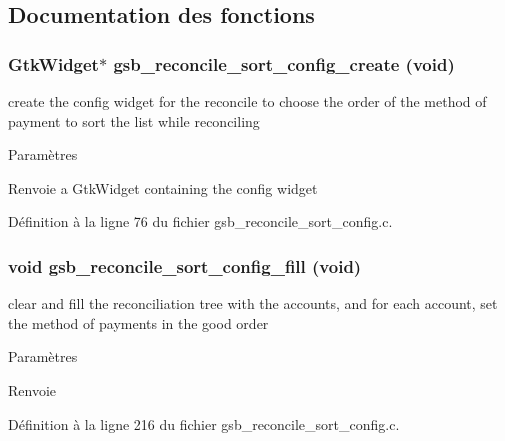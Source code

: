 \subsection{Documentation des fonctions}
\subsubsection[{gsb\_\-reconcile\_\-sort\_\-config\_\-create}]{\setlength{\rightskip}{0pt plus 5cm}GtkWidget$\ast$ gsb\_\-reconcile\_\-sort\_\-config\_\-create (void)}\label{gsb__reconcile__sort__config_8h_a9b08fc70938b33509231ca9cc5b8745f}
create the config widget for the reconcile to choose the order of the method of payment to sort the list while reconciling


\begin{DoxyParams}{Paramètres}
\item[{\em }]\end{DoxyParams}
\begin{DoxyReturn}{Renvoie}
a GtkWidget containing the config widget 
\end{DoxyReturn}


Définition à la ligne 76 du fichier gsb\_\-reconcile\_\-sort\_\-config.c.

\subsubsection[{gsb\_\-reconcile\_\-sort\_\-config\_\-fill}]{\setlength{\rightskip}{0pt plus 5cm}void gsb\_\-reconcile\_\-sort\_\-config\_\-fill (void)}\label{gsb__reconcile__sort__config_8h_ae0e1a7adc48388316184a5b8a53ef582}
clear and fill the reconciliation tree with the accounts, and for each account, set the method of payments in the good order


\begin{DoxyParams}{Paramètres}
\item[{\em }]\end{DoxyParams}
\begin{DoxyReturn}{Renvoie}

\end{DoxyReturn}


Définition à la ligne 216 du fichier gsb\_\-reconcile\_\-sort\_\-config.c.

